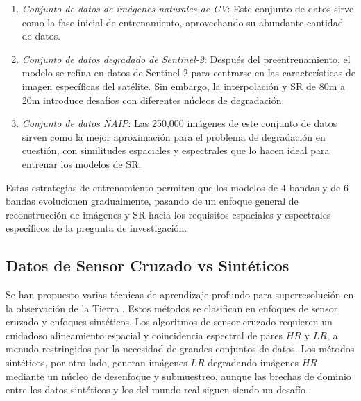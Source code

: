 \begin{enumerate}
    \item \textit{Conjunto de datos de imágenes naturales de CV}: Este conjunto de datos sirve como la fase inicial de entrenamiento, aprovechando su abundante cantidad de datos.
    \item \textit{Conjunto de datos degradado de Sentinel-2}: Después del preentrenamiento, el modelo se refina en datos de Sentinel-2 para centrarse en las características de imagen específicas del satélite. Sin embargo, la interpolación y SR de 80m a 20m introduce desafíos con diferentes núcleos de degradación.
    \item \textit{Conjunto de datos NAIP}: Las 250,000 imágenes de este conjunto de datos sirven como la mejor aproximación para el problema de degradación en cuestión, con similitudes espaciales y espectrales que lo hacen ideal para entrenar los modelos de SR.
\end{enumerate}

Estas estrategias de entrenamiento permiten que los modelos de 4 bandas y de 6 bandas evolucionen gradualmente, pasando de un enfoque general de reconstrucción de imágenes y SR hacia los requisitos espaciales y espectrales específicos de la pregunta de investigación.

\subsection{Datos de Sensor Cruzado vs Sintéticos}
Se han propuesto varias técnicas de aprendizaje profundo para superresolución en la observación de la Tierra \autocite{wang2022review, liu2021research, sdraka2022deep}. Estos métodos se clasifican en enfoques de sensor cruzado y enfoques sintéticos. Los algoritmos de sensor cruzado requieren un cuidadoso alineamiento espacial y coincidencia espectral de pares $HR$ y $LR$, a menudo restringidos por la necesidad de grandes conjuntos de datos. Los métodos sintéticos, por otro lado, generan imágenes $LR$ degradando imágenes $HR$ mediante un núcleo de desenfoque y submuestreo, aunque las brechas de dominio entre los datos sintéticos y los del mundo real siguen siendo un desafío \autocite{dong2022real, qiu2023cross, zhang2022single}.
